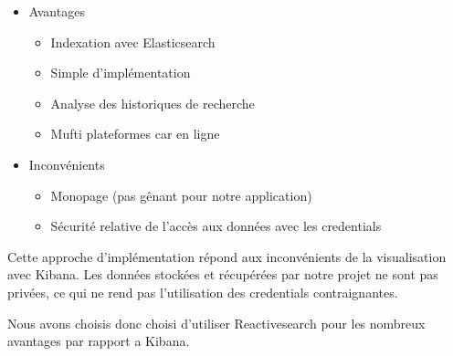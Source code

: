 \newpage
\begin{itemize}
    \item Avantages 
        \begin{itemize}
            \item Indexation avec Elasticsearch
	    \item Simple d’implémentation
	    \item Analyse des historiques de recherche
	    \item Mufti plateformes car en ligne
        \end{itemize}
    \item Inconvénients 
        \begin{itemize}
	    \item Monopage (pas gênant pour notre application)
	    \item Sécurité relative de l’accès aux données avec les credentials
        \end{itemize}
\end{itemize}

Cette approche d’implémentation répond aux inconvénients de la visualisation avec Kibana.
Les données stockées et récupérées par notre projet ne sont pas privées, ce qui ne rend pas l'utilisation des credentials contraignantes.

Nous avons choisis donc choisi d'utiliser Reactivesearch pour les nombreux avantages par rapport a Kibana. 


